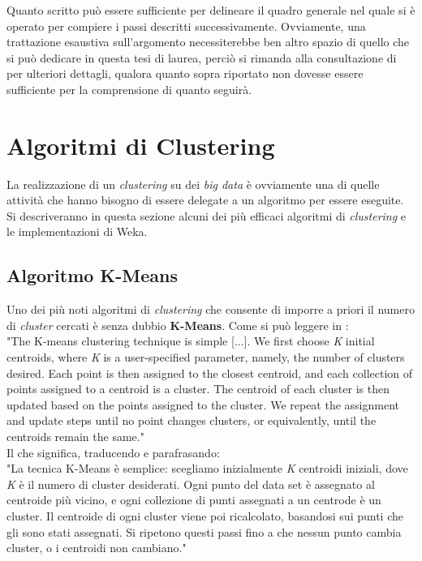     Quanto scritto può essere sufficiente per delineare il quadro generale nel quale si è operato per compiere i passi descritti successivamente. Ovviamente, una trattazione esaustiva sull'argomento necessiterebbe ben altro spazio di quello che si può dedicare in questa tesi di laurea, perciò si rimanda alla consultazione di \cite{dispense} per ulteriori dettagli, qualora quanto sopra riportato non dovesse essere sufficiente per la comprensione di quanto seguirà.

\section{Algoritmi di Clustering}

    La realizzazione di un \textit{clustering} su dei \textit{big data} è ovviamente una di quelle attività che hanno bisogno di essere delegate a un algoritmo per essere eseguite. Si descriveranno in questa sezione alcuni dei più efficaci algoritmi di \textit{clustering} e le implementazioni di Weka.

    \subsection{Algoritmo K-Means}

        Uno dei più noti algoritmi di \textit{clustering} che consente di imporre a priori il numero di \textit{cluster} cercati è senza dubbio \textbf{K-Means}. Come si può leggere in \cite{dispense}:\\

        "The K-means clustering technique is simple [...]. We first choose \textit{K} initial centroids, where \textit{K} is a user-specified parameter, namely, the number of clusters desired. Each point is then assigned to the closest centroid, and each collection of points assigned to a centroid is a cluster. The centroid of each cluster is then updated based on the points assigned to the cluster. We repeat the assignment and update steps until no point changes clusters, or equivalently, until the centroids remain the same." \\

        Il che significa, traducendo e parafrasando:\\

        "La tecnica K-Means è semplice: scegliamo inizialmente \textit{K} centroidi iniziali, dove \textit{K} è il numero di cluster desiderati. Ogni punto del data set è assegnato al centroide più vicino, e ogni collezione di punti assegnati a un centrode è un cluster. Il centroide di ogni cluster viene poi ricalcolato, basandosi sui punti che gli sono stati assegnati. Si ripetono questi passi fino a che nessun punto cambia cluster, o i centroidi non cambiano."\\

